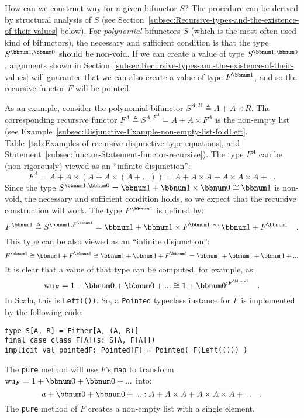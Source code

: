 How can we construct $\text{wu}_{F}$ for a given bifunctor $S$?
The procedure can be derived by structural analysis of $S$ (see Section~\ref{subsec:Recursive-types-and-the-existence-of-their-values}
below). For \emph{polynomial} bifunctors $S$ (which is the most often
used kind of bifunctors), the necessary and sufficient condition is
that the type $S^{\bbnum 1,\bbnum 0}$ should be non-void. If we can
create a value of type $S^{\bbnum 1,\bbnum 0}$, arguments shown in
Section~\ref{subsec:Recursive-types-and-the-existence-of-their-values}
will guarantee that we can also create a value of type $F^{\bbnum 1}$,
and so the recursive functor $F$ will be pointed.

As an example, consider the polynomial bifunctor $S^{A,R}\triangleq A+A\times R$.
The corresponding recursive functor $F^{A}\triangleq S^{A,F^{A}}=A+A\times F^{A}$
is the non-empty list (see Example~\ref{subsec:Disjunctive-Example-non-empty-list-foldLeft},
Table~\ref{tab:Examples-of-recursive-disjunctive-type-equations},
and Statement~\ref{subsec:functor-Statement-functor-recursive}).
The type $F^{A}$ can be (non-rigorously) viewed as an \textsf{``}infinite
disjunction\textsf{''}:
\[
F^{A}=A+A\times(A+A\times\left(A+...\right))=A+A\times A+A\times A\times A+...
\]
Since the type $S^{\bbnum 1,\bbnum 0}=\bbnum 1+\bbnum 1\times\bbnum 0\cong\bbnum 1$
is non-void, the necessary and sufficient condition holds, so we expect
that the recursive construction will work. The type $F^{\bbnum 1}$
is defined by:
\[
F^{\bbnum 1}\triangleq S^{\bbnum 1,F^{\bbnum 1}}=\bbnum 1+\bbnum 1\times F^{\bbnum 1}\cong\bbnum 1+F^{\bbnum 1}\quad.
\]
This type can be also viewed as an \textsf{``}infinite disjunction\textsf{''}:
\[
F^{\bbnum 1}\cong\bbnum 1+F^{\bbnum 1}\cong\bbnum 1+\bbnum 1+F^{\bbnum 1}=\bbnum 1+\bbnum 1+\bbnum 1+...
\]
It is clear that a value of that type can be computed, for example,
as:
\[
\text{wu}_{F}=1+\bbnum 0+\bbnum 0+...\cong1+\bbnum 0^{:F^{\bbnum 1}}\quad.
\]
In Scala, this is \lstinline!Left(())!. So, a \lstinline!Pointed!
typeclass instance for $F$ is implemented by the following code:
\begin{lstlisting}
type S[A, R] = Either[A, (A, R)]
final case class F[A](s: S[A, F[A]])
implicit val pointedF: Pointed[F] = Pointed( F(Left(())) )
\end{lstlisting}

The  \lstinline!pure! method will use $F$\textsf{'}s \lstinline!map! to
transform $\text{wu}_{F}=1+\bbnum 0+\bbnum 0+...$ into:
\[
a+\bbnum 0+\bbnum 0+...:A+A\times A+A\times A\times A+...\quad.
\]
The \lstinline!pure! method of $F$ creates a non-empty list with
a single element.

